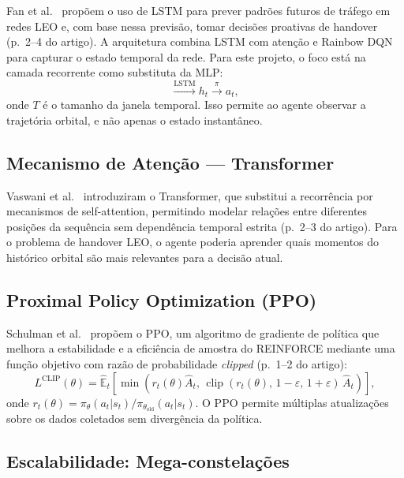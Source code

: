 \documentclass[12pt,a4paper]{article}
\begin{document}
Fan et al.~\cite{fan2025} propõem o uso de LSTM para prever padrões futuros de
tráfego em redes LEO e, com base nessa previsão, tomar decisões proativas de
handover (p.~2--4 do artigo). A arquitetura combina LSTM com atenção e Rainbow
DQN para capturar o estado temporal da rede. Para este projeto, o foco está na
camada recorrente como substituta da MLP:
\begin{equation}
  [s_{t-T+1}, \ldots, s_t] \xrightarrow{\text{LSTM}} h_t \xrightarrow{\pi} a_t,
\end{equation}
onde $T$ é o tamanho da janela temporal. Isso permite ao agente observar a
trajetória orbital, e não apenas o estado instantâneo.

\subsection{Mecanismo de Atenção --- Transformer}

Vaswani et al.~\cite{vaswani2017} introduziram o Transformer, que substitui a
recorrência por mecanismos de self-attention, permitindo modelar relações entre
diferentes posições da sequência sem dependência temporal estrita (p.~2--3 do
artigo). Para o problema de handover LEO, o agente poderia aprender quais
momentos do histórico orbital são mais relevantes para a decisão atual.

\subsection{Proximal Policy Optimization (PPO)}

Schulman et al.~\cite{schulman2017} propõem o PPO, um algoritmo de gradiente de
política que melhora a estabilidade e a eficiência de amostra do REINFORCE
mediante uma função objetivo com razão de probabilidade \textit{clipped} (p.~1--2
do artigo):
\begin{equation}
  L^{\text{CLIP}}(\theta) = \hat{\mathbb{E}}_t\!\left[
    \min\!\left(r_t(\theta)\hat{A}_t,\,
    \operatorname{clip}(r_t(\theta),\,1-\varepsilon,\,1+\varepsilon)\,\hat{A}_t
    \right)
  \right],
  \label{eq:ppo}
\end{equation}
onde $r_t(\theta) = \pi_\theta(a_t|s_t) / \pi_{\theta_{\text{old}}}(a_t|s_t)$.
O PPO permite múltiplas atualizações sobre os dados coletados sem divergência da
política.

\subsection{Escalabilidade: Mega-constelações}
\end{document}
